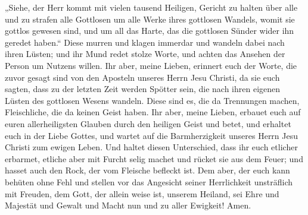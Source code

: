 „Siehe, der Herr kommt mit vielen tausend Heiligen, 
Gericht zu halten über alle und zu strafen alle Gottlosen um alle Werke
ihres gottlosen Wandels, womit sie gottlos gewesen sind, und um all das
Harte, das die gottlosen Sünder wider ihn geredet haben.`` 
Diese murren und klagen immerdar und wandeln dabei nach ihren Lüsten;
und ihr Mund redet stolze Worte, und achten das Ansehen der Person um
Nutzens willen.  Ihr aber, meine Lieben, erinnert euch der
Worte, die zuvor gesagt sind von den Aposteln unseres Herrn Jesu
Christi,  da sie euch sagten, dass zu der letzten Zeit
werden Spötter sein, die nach ihren eigenen Lüsten des gottlosen Wesens
wandeln.  Diese sind es, die da Trennungen machen,
Fleischliche, die da keinen Geist haben.  Ihr aber, meine
Lieben, erbauet euch auf euren allerheiligsten Glauben durch den
heiligen Geist und betet,  und erhaltet euch in der Liebe
Gottes, und wartet auf die Barmherzigkeit unseres Herrn Jesu Christi zum
ewigen Leben.  Und haltet diesen Unterschied, dass ihr euch
etlicher erbarmet,  etliche aber mit Furcht selig machet
und rücket sie aus dem Feuer; und hasset auch den Rock, der vom Fleische
befleckt ist.  Dem aber, der euch kann behüten ohne Fehl
und stellen vor das Angesicht seiner Herrlichkeit unsträflich mit
Freuden,  dem Gott, der allein weise ist, unserem Heiland,
sei Ehre und Majestät und Gewalt und Macht nun und zu aller Ewigkeit!
Amen.
